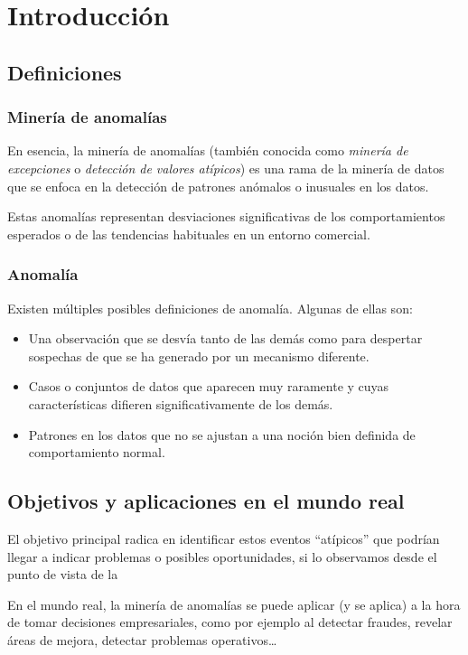 \chapter{Introducción}
\section{Definiciones}
\subsection{Minería de anomalías}
En esencia, la minería de anomalías (también conocida como \textit{minería de excepciones} o
\textit{detección de valores atípicos}) es una rama de la minería de datos que se enfoca en
la detección de patrones anómalos o inusuales en los datos.

Estas anomalías representan desviaciones significativas de los comportamientos esperados
o de las tendencias habituales en un entorno comercial.
\subsection{Anomalía}
Existen múltiples posibles definiciones de anomalía. Algunas de ellas son:
\begin{itemize}[noitemsep,topsep=0pt]
	\item Una observación que se desvía tanto de las demás como para despertar sospechas de
		que se ha generado por un mecanismo diferente.
	\item Casos o conjuntos de datos que aparecen muy raramente y cuyas características
		difieren significativamente de los demás.
	\item Patrones en los datos que no se ajustan a una noción bien definida de comportamiento
		normal.
\end{itemize}

\section{Objetivos y aplicaciones en el mundo real}
El objetivo principal radica en identificar estos eventos ``atípicos'' que podrían llegar
a indicar problemas o posibles oportunidades, si lo observamos desde el punto de vista de
la \subject.

En el mundo real, la minería de anomalías se puede aplicar (y se aplica) a la hora de
tomar decisiones empresariales, como por ejemplo al detectar fraudes, revelar áreas de
mejora, detectar problemas operativos\ldots

